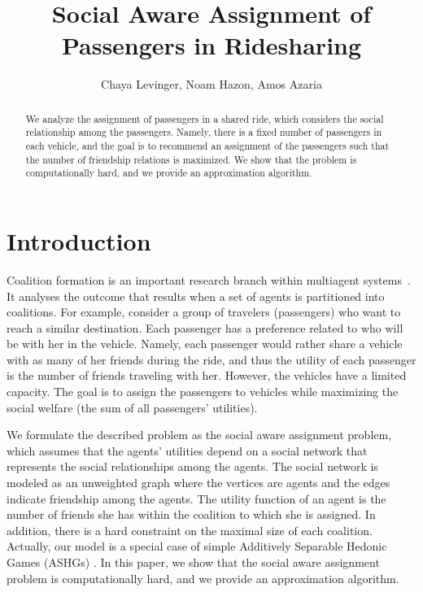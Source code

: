 \documentclass[letterpaper]{article} %
\title{Social Aware Assignment of Passengers in Ridesharing}
\author {
    Chaya Levinger, %
    Noam Hazon, %
    Amos Azaria%
}
\begin{document}
\maketitle

\begin{abstract}
    We analyze the assignment of passengers in a shared ride, which considers the social relationship among the passengers. Namely, there is a fixed number of passengers in each vehicle, and the goal is to recommend an assignment of the passengers such that the number of friendship relations is maximized. We show that the  problem is computationally hard, and we provide an approximation algorithm.
\end{abstract}


\section{Introduction}


Coalition formation is an important research branch within multiagent systems~\cite{chalkiadakis2011computational}.
It analyses the outcome that results when a set of agents is partitioned into coalitions.
For example, consider a group of travelers (passengers) who want to reach a similar destination. Each passenger has a preference related to who will be with her in the vehicle. Namely, each passenger would rather share a vehicle with as many of her friends during the ride, and thus the utility of each passenger is the number of friends traveling with her.  However, the vehicles have a limited capacity. The goal is to assign the passengers to vehicles while maximizing the social welfare (the sum of all passengers' utilities).

We formulate the described problem as the social aware assignment problem, which assumes that the agents' utilities depend on a social network that represents the social relationships among the agents. The
social network is modeled as an unweighted graph where the
vertices are agents and the edges indicate friendship among
the agents. The utility function of an agent is the number
of friends she has within the coalition to which she is assigned.
In addition, there is a hard constraint on the maximal size of each coalition.
Actually, our model is a special case of simple Additively
Separable Hedonic Games (ASHGs) \cite{bogomolnaia2002stability}.
In this paper, we show that the social aware assignment problem is computationally hard, and we provide an approximation algorithm.
\end{document}
